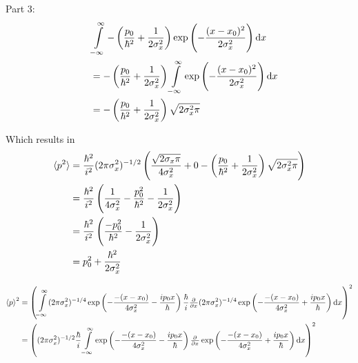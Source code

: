 \documentclass[a4paper,german,12pt,smallheadings]{scrartcl}
\begin{document}
\begin{enumerate}[a)]
    Part 3:
    \begin{align*}
      \quad&\int\limits_{-\infty}^\infty
      -\del{\frac{p_0}{\hbar^2} + \frac{1}{2\sigma_x^2}}
      \exp\del{-\frac{(x-x_0)^2}{2\sigma_x^2}} \dif x \\
      &=
      -\del{\frac{p_0}{\hbar^2} + \frac{1}{2\sigma_x^2}}
      \int\limits_{-\infty}^\infty
      \exp\del{-\frac{(x-x_0)^2}{2\sigma_x^2}} \dif x \\
      &=
      -\del{\frac{p_0}{\hbar^2} + \frac{1}{2\sigma_x^2}}
      \sqrt{2 \sigma_x^2 \pi}
    \end{align*}

    Which results in
    \begin{align*}
      \braket{p^2} &= \frac{\hbar^2}{i^2}(2 \pi \sigma_x^2)^{-1/2} \del{
        \frac{\sqrt{2 \sigma_x \pi}}{4 \sigma_x^2} +
        0 -
        \del{\frac{p_0}{\hbar^2} + \frac{1}{2\sigma_x^2}} \sqrt{2 \sigma_x^2 \pi}
      } \\
      &=
      \frac{\hbar^2}{i^2} \del{\frac{1}{4\sigma_x^2} - \frac{p_0^2}{\hbar^2} - \frac{1}{2 \sigma_x^2}} \\
      &= \frac{\hbar^2}{i^2} \del{\frac{-p_0^2}{\hbar^2} - \frac{1}{2\sigma_x^2}} \\
      &= p_0^2 + \frac{\hbar^2}{2\sigma_x^2}
    \end{align*}

    \begin{align*}
      \braket{p}^2 &= \del{
                        \int\limits_{-\infty}^\infty 
                        (2\pi\sigma_x^2)^{-1/4} \exp\del{-\frac{-(x-x_0)}{4\sigma_x^2} - \frac{ip_0x}{\hbar}}
                        \frac{\hbar}{i} \pd{}{x}
                        (2\pi\sigma_x^2)^{-1/4} \exp\del{-\frac{-(x-x_0)}{4\sigma_x^2} + \frac{ip_0x}{\hbar}}
                        \dif x
                       }^2 \\
                    &= \del{
                       (2\pi\sigma_x^2)^{-1/2} \frac{\hbar}{i}
                        \int\limits_{-\infty}^\infty
                        \exp\del{-\frac{-(x-x_0)}{4\sigma_x^2} - \frac{ip_0x}{\hbar}}
                        \pd{}{x}
                        \exp\del{-\frac{-(x-x_0)}{4\sigma_x^2} + \frac{ip_0x}{\hbar}}
                        \dif x
                       }^2
    \end{align*}


\end{enumerate}
\end{document}
